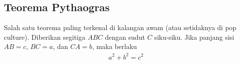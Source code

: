 \subsection{Teorema Pythaogras}
Salah satu teorema paling terkenal di kalangan awam (atau setidaknya di pop culture). Diberikan segitiga $ABC$ dengan sudut $C$ siku-siku. Jika panjang sisi $AB=c$, $BC=a$, dan $CA=b$, maka berlaku
\begin{align*}
    a^2+b^2=c^2
\end{align*}
\begin{center}
\end{center}
